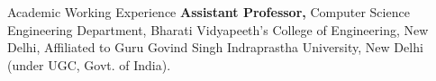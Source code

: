 \begin{rubric}{Academic Working Experience}
%
	\textbf{Assistant Professor,} Computer Science Engineering Department, Bharati Vidyapeeth's College of Engineering, New Delhi, Affiliated to Guru Govind Singh Indraprastha University, New Delhi (under UGC, Govt. of India).
%
%

%
\end{rubric}